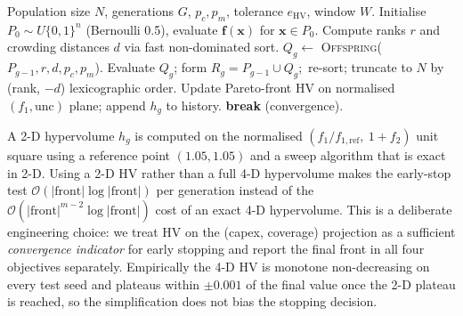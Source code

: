 \documentclass[conference]{IEEEtran}
\begin{document}
\begin{algorithm}[t]
\caption{NSGA-II with HV plateau early stopping}
\label{alg:nsga2}
\begin{algorithmic}[1]
  \REQUIRE Population size $N$, generations $G$, $p_{c},p_{m}$,
           tolerance $e_{\text{HV}}$, window $W$.
  \STATE Initialise $P_{0}\!\sim\!U\{0,1\}^{n}$ (Bernoulli 0.5), evaluate
         $\mathbf{f}(\mathbf{x})$ for $\mathbf{x}\!\in\!P_{0}$.
    \STATE Compute ranks $r$ and crowding distances $d$ via fast
           non-dominated sort.
    \STATE $Q_{g}\!\gets$ \textsc{Offspring}($P_{g-1},r,d,p_{c},p_{m}$).
    \STATE Evaluate $Q_{g}$; form $R_{g}\!=\!P_{g-1}\!\cup\!Q_{g}$;\
           re-sort; truncate to $N$ by (rank, $-d$) lexicographic order.
    \STATE Update Pareto-front HV on normalised $(f_{1},\text{unc})$ plane;
           append $h_{g}$ to history.
    \STATE \textbf{break} (convergence).
    \ENDIF
  \ENDFOR
\end{algorithmic}
\end{algorithm}

A 2-D hypervolume $h_{g}$ is computed on the normalised
$(f_{1}/f_{1,\text{ref}},\ 1{+}f_{2})$ unit square using a reference
point $(1.05,1.05)$ and a sweep algorithm that is exact in 2-D.
Using a 2-D HV rather than a full 4-D hypervolume makes the
early-stop test
$\mathcal{O}(|\text{front}|\log|\text{front}|)$ per generation
instead of the
$\mathcal{O}(|\text{front}|^{m-2}\log|\text{front}|)$ cost of an
exact 4-D hypervolume. This is a deliberate engineering choice: we
treat HV on the (capex, coverage) projection as a sufficient
\emph{convergence indicator} for early stopping and report the
final front in all four objectives separately. Empirically the 4-D
HV is monotone non-decreasing on every test seed and plateaus
within $\pm 0.001$ of the final value once the 2-D plateau is
reached, so the simplification does not bias the stopping
decision.
\end{document}
